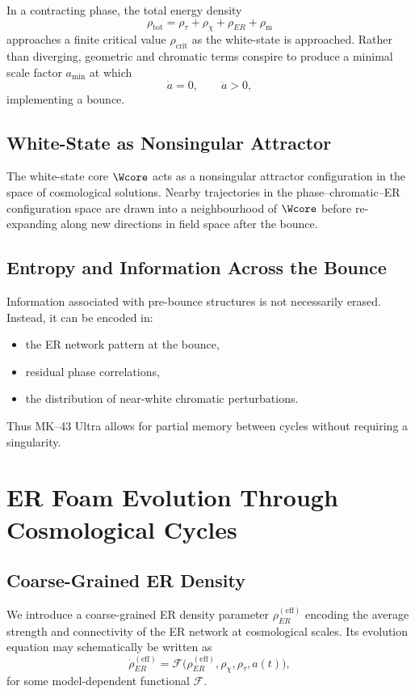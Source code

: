 In a contracting phase, the total energy density
\[
  \rho_{\mathrm{tot}} = \rho_\tau + \rho_\chi + \rho_{ER} + \rho_{\mathrm{m}}
\]
approaches a finite critical value $\rho_{\mathrm{crit}}$ as the white-state is approached.
Rather than diverging, geometric and chromatic terms conspire to produce a minimal scale factor $a_{\mathrm{min}}$ at which
\[
  \dot{a} = 0, \qquad \ddot{a} > 0,
\]
implementing a bounce.

\section{White-State as Nonsingular Attractor}

The white-state core $\Wcore$ acts as a nonsingular attractor configuration in the space of cosmological solutions.
Nearby trajectories in the phase--chromatic--ER configuration space are drawn into a neighbourhood of $\Wcore$ before re-expanding along new directions in field space after the bounce.

\section{Entropy and Information Across the Bounce}

Information associated with pre-bounce structures is not necessarily erased.
Instead, it can be encoded in:

\begin{itemize}
  \item the ER network pattern at the bounce,
  \item residual phase correlations,
  \item the distribution of near-white chromatic perturbations.
\end{itemize}

Thus MK--43 Ultra allows for partial memory between cycles without requiring a singularity.

\chapter{ER Foam Evolution Through Cosmological Cycles}

\section{Coarse-Grained ER Density}

We introduce a coarse-grained ER density parameter $\rho_{ER}^{\mathrm{(eff)}}$ encoding the average strength and connectivity of the ER network at cosmological scales.
Its evolution equation may schematically be written as
\[
  \dot{\rho}_{ER}^{\mathrm{(eff)}}
  =
  \mathcal{F}\big(\rho_{ER}^{\mathrm{(eff)}}, \rho_\chi, \rho_\tau, a(t)\big),
\]
for some model-dependent functional $\mathcal{F}$.

